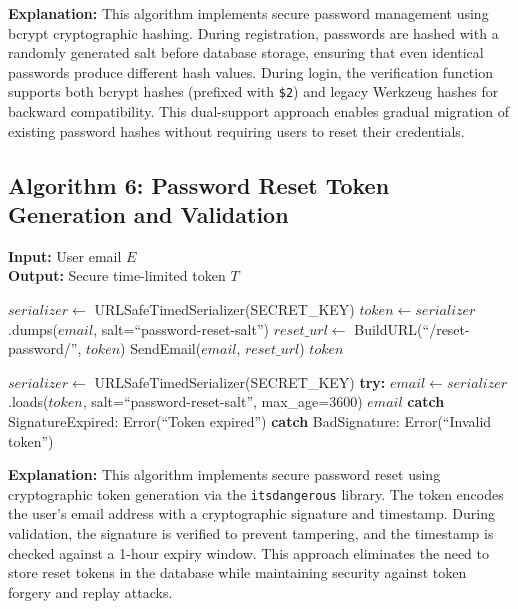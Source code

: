 \textbf{Explanation:}
This algorithm implements secure password management using bcrypt cryptographic hashing. During registration, passwords are hashed with a randomly generated salt before database storage, ensuring that even identical passwords produce different hash values. During login, the verification function supports both bcrypt hashes (prefixed with \texttt{\$2}) and legacy Werkzeug hashes for backward compatibility. This dual-support approach enables gradual migration of existing password hashes without requiring users to reset their credentials.


\subsection{Algorithm 6: Password Reset Token Generation and Validation}

\textbf{Input:} User email $E$ \\
\textbf{Output:} Secure time-limited token $T$

\begin{algorithm}[H]
\caption{Token-Based Password Reset}
\begin{algorithmic}[1]

    \State $serializer \gets$ URLSafeTimedSerializer(SECRET\_KEY)
    \State $token \gets serializer$.dumps($email$, salt=``password-reset-salt'')
    \State $reset\_url \gets$ BuildURL(``/reset-password/'', $token$)
    \State SendEmail($email$, $reset\_url$)
    \State \Return $token$
\EndFunction


    \State $serializer \gets$ URLSafeTimedSerializer(SECRET\_KEY)
    \State \textbf{try:}
    \State \hspace{1em} $email \gets serializer$.loads($token$, salt=``password-reset-salt'', max\_age=3600)
    \State \hspace{1em} \Return $email$ 
    \State \textbf{catch} SignatureExpired:
    \State \hspace{1em} \Return Error(``Token expired'')
    \State \textbf{catch} BadSignature:
    \State \hspace{1em} \Return Error(``Invalid token'')
\EndFunction

\end{algorithmic}
\end{algorithm}

\textbf{Explanation:}
This algorithm implements secure password reset using cryptographic token generation via the \texttt{itsdangerous} library. The token encodes the user's email address with a cryptographic signature and timestamp. During validation, the signature is verified to prevent tampering, and the timestamp is checked against a 1-hour expiry window. This approach eliminates the need to store reset tokens in the database while maintaining security against token forgery and replay attacks.


